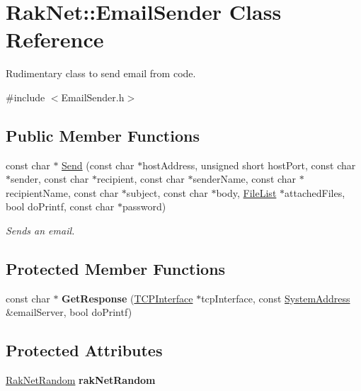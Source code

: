 \hypertarget{class_rak_net_1_1_email_sender}{\section{Rak\-Net\-:\-:Email\-Sender Class Reference}
\label{class_rak_net_1_1_email_sender}
}


Rudimentary class to send email from code.  




{\ttfamily \#include $<$Email\-Sender.\-h$>$}

\subsection*{Public Member Functions}
\begin{DoxyCompactItemize}
\item 
const char $\ast$ \hyperlink{class_rak_net_1_1_email_sender_a1910ce11600d5c536307244ddb7d87ee}{Send} (const char $\ast$host\-Address, unsigned short host\-Port, const char $\ast$sender, const char $\ast$recipient, const char $\ast$sender\-Name, const char $\ast$recipient\-Name, const char $\ast$subject, const char $\ast$body, \hyperlink{class_rak_net_1_1_file_list}{File\-List} $\ast$attached\-Files, bool do\-Printf, const char $\ast$password)
\begin{DoxyCompactList}\small\item\em Sends an email. \end{DoxyCompactList}\end{DoxyCompactItemize}
\subsection*{Protected Member Functions}
\begin{DoxyCompactItemize}
\item 
\hypertarget{class_rak_net_1_1_email_sender_ae7d989619a6ae90580742b3be37c993d}{const char $\ast$ {\bfseries Get\-Response} (\hyperlink{class_rak_net_1_1_t_c_p_interface}{T\-C\-P\-Interface} $\ast$tcp\-Interface, const \hyperlink{struct_rak_net_1_1_system_address}{System\-Address} \&email\-Server, bool do\-Printf)}\label{class_rak_net_1_1_email_sender_ae7d989619a6ae90580742b3be37c993d}

\end{DoxyCompactItemize}
\subsection*{Protected Attributes}
\begin{DoxyCompactItemize}
\item 
\hypertarget{class_rak_net_1_1_email_sender_ac8a79faa447e299607cbed3ff9fad1ae}{\hyperlink{class_rak_net_1_1_rak_net_random}{Rak\-Net\-Random} {\bfseries rak\-Net\-Random}}\label{class_rak_net_1_1_email_sender_ac8a79faa447e299607cbed3ff9fad1ae}

\end{DoxyCompactItemize}


